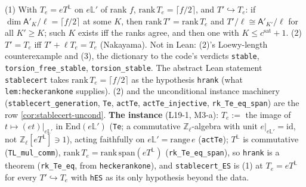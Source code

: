 \begin{corollary}\label{cor:stablecert}
  \leanok
  (1) With $T_e=eT^{\mathbb L}$ on $e\mathbb L'$ of rank $f$, $\mathrm{rank}\,T_e=\lceil f/2\rceil$, and $T'\hookrightarrow T_e$: if
  $\dim\mathsf A'_K/\ell=\lceil f/2\rceil$ at some $K$, then $\mathrm{rank}\,T'=\mathrm{rank}\,T_e$ and $T'/\ell\cong\mathsf A'_{K'}/\ell$ for all
  $K'\ge K$; such $K$ exists iff the ranks agree, and then one with $K\le c^{\mathrm{sat}}+1$. (2) $T'=T_e$ iff
  $T'+\ell T_e=T_e$ (Nakayama). Not in Lean: (2)'s Loewy-length counterexample and (3), the dictionary to
  the code's verdicts \texttt{stable}, \texttt{torsion\_free\_stable}, \texttt{torsion\_stable}. The abstract Lean statement
  \texttt{stablecert} takes $\mathrm{rank}\,T_e=\lceil f/2\rceil$ as the hypothesis \texttt{hrank} (what \texttt{lem:heckerankone}
  supplies). (2) and the unconditional instance machinery (\texttt{stablecert\_generation}, \texttt{Te}, \texttt{actTe},
  \texttt{actTe\_injective}, \texttt{rk\_Te\_eq\_span}) are the row \ref{cor:stablecert-uncond}. \textbf{The instance} (L19-1, M3-a): $T_e:=$ the image of $t\mapsto(et)|_{e\mathbb L'}$ in $\mathrm{End}(e\mathbb L')$
  (\texttt{Te}; a commutative $\mathbb Z_\ell$-algebra with unit $e|_{e\mathbb L'}=\mathrm{id}$, not $\mathbb Z_\ell[eT^{\mathbb L}]\ni1$),
  acting faithfully on $e\mathbb L'=\mathrm{range}\,e$ (\texttt{actTe}); $T^{\mathbb L}$ is commutative (\texttt{TL\_mul\_comm}),
  $\mathrm{rank}\,T_e=\mathrm{rank}\,\mathrm{span}(eT^{\mathbb L})$ (\texttt{rk\_Te\_eq\_span}), so \texttt{hrank} is a theorem
  (\texttt{rk\_Te\_eq}, from \texttt{heckerankone}), and \texttt{stablecert\_ES} is (1) at $T_e=eT^{\mathbb L}$ for every
  $T'\hookrightarrow T_e$ with \texttt{hES} as its only hypothesis beyond the data.
\end{corollary}
